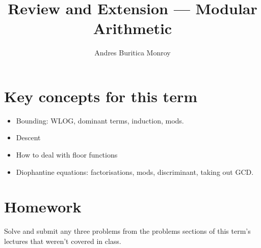 \documentclass{article}
\title{Review and Extension --- Modular Arithmetic}
\author{Andres Buritica Monroy}
\date{}
\begin{document}
\maketitle
\section{Key concepts for this term}
  \begin{itemize}
    \item Bounding: WLOG, dominant terms, induction, mods.
    \item Descent
    \item How to deal with floor functions
    \item Diophantine equations: factorisations, mods, discriminant, taking out
      GCD\@.
  \end{itemize}
\section{Homework}
Solve and submit any three problems from the problems sections of this term's
lectures that weren't covered in class.
\end{document}
